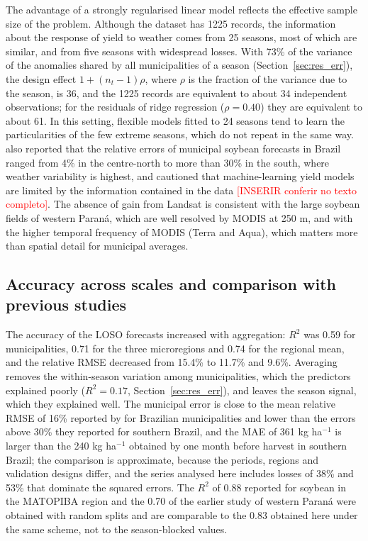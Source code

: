 \documentclass[pdflatex,sn-basic]{sn-jnl}
\newcommand{\inserir}[1]{\textcolor{red}{[INSERIR #1]}}
\begin{document}
The advantage of a strongly regularised linear model reflects the effective sample size of the problem. Although the dataset has 1225 records, the information about the response of yield to weather comes from 25 seasons, most of which are similar, and from five seasons with widespread losses. With 73\% of the variance of the anomalies shared by all municipalities of a season (Section~\ref{sec:res_err}), the design effect $1 + (n_t - 1)\rho$, where $\rho$ is the fraction of the variance due to the season, is 36, and the 1225 records are equivalent to about 34 independent observations; for the residuals of ridge regression ($\rho = 0.40$) they are equivalent to about 61. In this setting, flexible models fitted to 24 seasons tend to learn the particularities of the few extreme seasons, which do not repeat in the same way. \citet{vonBloh2023} also reported that the relative errors of municipal soybean forecasts in Brazil ranged from 4\% in the centre-north to more than 30\% in the south, where weather variability is highest, and \citet{lischeid2022} cautioned that machine-learning yield models are limited by the information contained in the data \inserir{conferir no texto completo}. The absence of gain from Landsat is consistent with the large soybean fields of western Paraná, which are well resolved by MODIS at 250 m, and with the higher temporal frequency of MODIS (Terra and Aqua), which matters more than spatial detail for municipal averages.

\subsection{Accuracy across scales and comparison with previous studies}\label{sec:res_escala}
The accuracy of the LOSO forecasts increased with aggregation: $R^2$ was 0.59 for municipalities, 0.71 for the three microregions and 0.74 for the regional mean, and the relative RMSE decreased from 15.4\% to 11.7\% and 9.6\%. Averaging removes the within-season variation among municipalities, which the predictors explained poorly ($R^2 = 0.17$, Section~\ref{sec:res_err}), and leaves the season signal, which they explained well. The municipal error is close to the mean relative RMSE of 16\% reported by \citet{vonBloh2023} for Brazilian municipalities and lower than the errors above 30\% they reported for southern Brazil, and the MAE of 361 kg ha$^{-1}$ is larger than the 240 kg ha$^{-1}$ obtained by \citet{Schwalbert2020} one month before harvest in southern Brazil; the comparison is approximate, because the periods, regions and validation designs differ, and the series analysed here includes losses of 38\% and 53\% that dominate the squared errors. The $R^2$ of 0.88 reported for soybean in the MATOPIBA region \citep{BarbosadosSantos2021} and the 0.70 of the earlier study of western Paraná \citep{tluszcz2025} were obtained with random splits and are comparable to the 0.83 obtained here under the same scheme, not to the season-blocked values.
\end{document}
